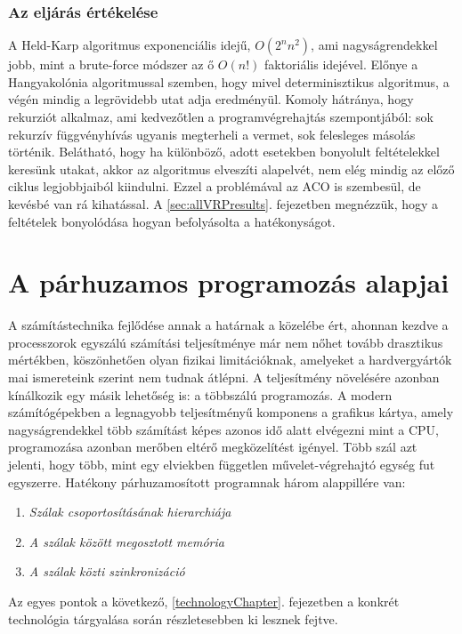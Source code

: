 \subsubsection{Az eljárás értékelése}
\label{sssec:HeldKarpEvaluate}
A Held-Karp algoritmus exponenciális idejű, \(O(2^nn^2)\), ami nagyságrendekkel jobb, mint a brute-force módszer az ő \(O(n!)\) faktoriális idejével. Előnye a Hangyakolónia algoritmussal szemben, hogy mivel determinisztikus algoritmus, a végén mindig a legrövidebb utat adja eredményül. Komoly hátránya, hogy rekurziót alkalmaz, ami kedvezőtlen a programvégrehajtás szempontjából: sok rekurzív függvényhívás ugyanis megterheli a vermet, sok felesleges másolás történik. Belátható, hogy ha különböző, adott esetekben bonyolult feltételekkel keresünk utakat, akkor az algoritmus elveszíti alapelvét, nem elég mindig az előző ciklus legjobbjaiból kiindulni. Ezzel a problémával az ACO is szembesül, de kevésbé van rá kihatással. A \ref{sec:allVRPresults}. fejezetben megnézzük, hogy a feltételek bonyolódása hogyan befolyásolta a hatékonyságot.


\section{A párhuzamos programozás alapjai} \label{secParallelProgramming}

A számítástechnika fejlődése annak a határnak a közelébe ért, ahonnan kezdve a processzorok egyszálú számítási teljesítménye már nem nőhet tovább drasztikus mértékben, köszönhetően olyan fizikai limitációknak, amelyeket a hardvergyártók mai ismereteink szerint nem tudnak átlépni. A teljesítmény növelésére azonban kínálkozik egy másik lehetőség is: a többszálú programozás. A modern számítógépekben a legnagyobb teljesítményű komponens a grafikus kártya, amely nagyságrendekkel több számítást képes azonos idő alatt elvégezni mint a CPU, programozása azonban merőben eltérő megközelítést igényel. Több szál azt jelenti, hogy több, mint egy elviekben független művelet-végrehajtó egység fut egyszerre. Hatékony párhuzamosított programnak három alappillére van: \cite{kvantum_optim}
\begin{enumerate}
	\item \emph{Szálak csoportosításának hierarchiája}
	\item \emph{A szálak között megosztott memória}
	\item \emph{A szálak közti szinkronizáció}
\end{enumerate}

\noindent
Az egyes pontok a következő, \ref{technologyChapter}. fejezetben a konkrét technológia tárgyalása során részletesebben ki lesznek fejtve.


